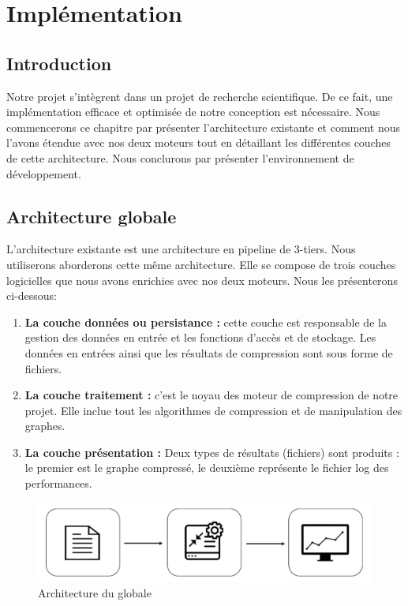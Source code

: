 \chapter{Implémentation}
	\section{Introduction}
	
	Notre projet s'intègrent dans un projet de recherche scientifique. De ce fait, une implémentation efficace et optimisée de notre conception est nécessaire. Nous commencerons ce chapitre par présenter l'architecture existante et comment nous l'avons étendue avec nos deux moteurs tout en détaillant les différentes couches de cette architecture. Nous conclurons par présenter l'environnement de développement.
	
	
	\section{Architecture globale}
	
	L'architecture existante est une architecture en pipeline de 3-tiers. Nous utiliserons aborderons cette même architecture. Elle se compose de trois couches logicielles que nous avons enrichies avec nos deux moteurs. Nous les présenterons ci-dessous:
	
	\begin{enumerate}
	\item \textbf{La couche données ou persistance :} cette couche est responsable de la gestion des données en entrée et les fonctions d'accès et de stockage. Les données en entrées ainsi que les résultats de compression sont sous forme de fichiers.
	
	\item \textbf{La couche traitement :} c'est le noyau des moteur de compression de notre projet. Elle inclue tout les algorithmes de compression et de manipulation des graphes. 
	
	\item \textbf{La couche présentation :}  Deux types de résultats (fichiers) sont produits : le premier est le graphe compressé, le deuxième représente le fichier log des performances. 
	\end{enumerate}
		
	
\begin{figure}[H]
	\centering
	
	\includegraphics[scale=0.35]{ressources/image/ArchGlob.jpg}
	\caption{Architecture du globale}
	\label{Img:archglob}
 \end{figure}
	
